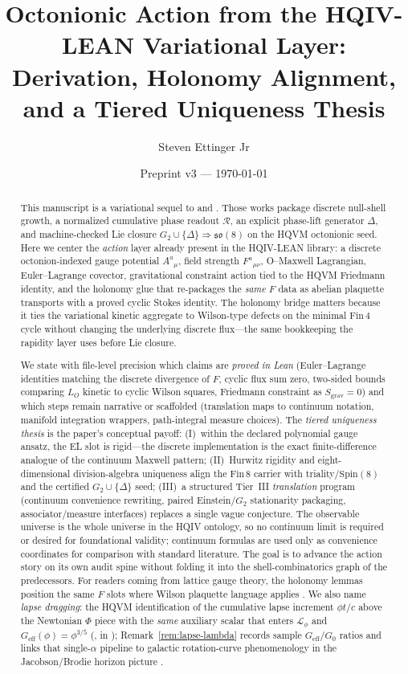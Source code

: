 \documentclass[11pt]{amsart}
\title[Octonionic Action and Uniqueness]{Octonionic Action from the HQIV-LEAN Variational Layer:\\
Derivation, Holonomy Alignment, and a Tiered Uniqueness Thesis}
\author{Steven Ettinger Jr}
\date{Preprint v3 --- \today}
\begin{document}
\begin{abstract}
This manuscript is a variational sequel to \cite{hqiv-so8-paper} and \cite{hqiv-3d-growth-paper}. Those works package discrete null-shell growth, a normalized cumulative phase readout \(\mathcal{R}\), an explicit phase-lift generator \(\Delta\), and machine-checked Lie closure \(G_2\cup\{\Delta\}\Rightarrow\mathfrak{so}(8)\) on the HQVM octonionic seed. Here we center the \emph{action} layer already present in the HQIV-LEAN library: a discrete octonion-indexed gauge potential \(A^a{}_\mu\), field strength \(F^a{}_{\mu\nu}\), O--Maxwell Lagrangian, Euler--Lagrange covector, gravitational constraint action tied to the HQVM Friedmann identity, and the holonomy glue that re-packages the \emph{same} \(F\) data as abelian plaquette transports with a proved cyclic Stokes identity. The holonomy bridge matters because it ties the variational kinetic aggregate to Wilson-type defects on the minimal \(\mathrm{Fin}\,4\) cycle without changing the underlying discrete flux---the same bookkeeping the rapidity layer uses before Lie closure.

We state with file-level precision which claims are \emph{proved in Lean} (Euler--Lagrange identities matching the discrete divergence of \(F\), cyclic flux sum zero, two-sided bounds comparing \(L_O\) kinetic to cyclic Wilson squares, Friedmann constraint as \(S_{\mathrm{grav}}=0\)) and which steps remain narrative or scaffolded (translation maps to continuum notation, manifold integration wrappers, path-integral measure choices). The \emph{tiered uniqueness thesis} is the paper's conceptual payoff: (I)~within the declared polynomial gauge ansatz, the EL slot is rigid---the discrete implementation is the exact finite-difference analogue of the continuum Maxwell pattern; (II)~Hurwitz rigidity and eight-dimensional division-algebra uniqueness align the \(\mathrm{Fin}\,8\) carrier with triality/\(\mathrm{Spin}(8)\) and the certified \(G_2\cup\{\Delta\}\) seed; (III)~a structured Tier~III \emph{translation} program (continuum convenience rewriting, paired Einstein/\(G_2\) stationarity packaging, associator/measure interfaces) replaces a single vague conjecture. The observable universe is the whole universe in the HQIV ontology, so no continuum limit is required or desired for foundational validity; continuum formulas are used only as convenience coordinates for comparison with standard literature. The goal is to advance the action story on its own audit spine without folding it into the shell-combinatorics graph of the predecessors. For readers coming from lattice gauge theory, the holonomy lemmas position the same \(F\) slots where Wilson plaquette language applies \cite{wilson1974,creutz1983}. We also name \emph{lapse dragging}: the HQVM identification of the cumulative lapse increment \(\phi t/c\) above the Newtonian \(\Phi\) piece with the \emph{same} auxiliary scalar that enters \(\mathcal{L}_\phi\) and \(G_{\mathrm{eff}}(\phi)=\phi^{3/5}\) (,  in ); Remark~\ref{rem:lapse-lambda} records sample \(G_{\mathrm{eff}}/G_0\) ratios and links that single-\(\alpha\) pipeline to galactic rotation-curve phenomenology in the Jacobson/Brodie horizon picture \cite{jacobson1995,brodie2026}.
\end{abstract}
\end{document}
